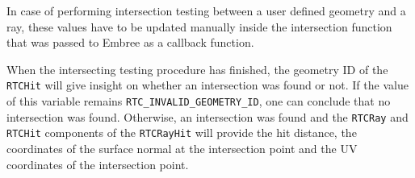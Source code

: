 In case of performing intersection testing between a user defined geometry and a ray, these values have to be updated manually inside the intersection function that was passed to Embree as a callback function.

When the intersecting testing procedure has finished, the geometry ID of the \texttt{RTCHit} will give insight on whether an intersection was found or not. If the value of this variable remains \texttt{RTC\_INVALID\_GEOMETRY\_ID}, one can conclude that no intersection was found. Otherwise, an intersection was found and the \texttt{RTCRay} and \texttt{RTCHit} components of the \texttt{RTCRayHit} will provide the hit distance, the coordinates of the surface normal at the intersection point and the UV coordinates of the intersection point.